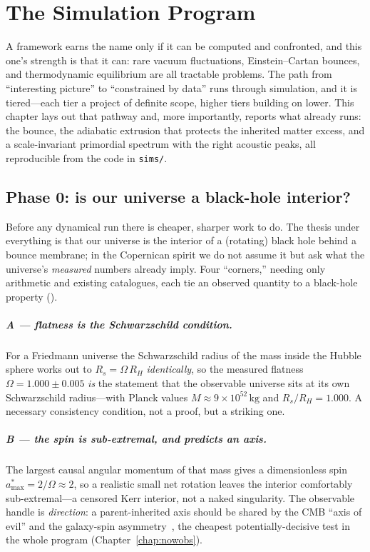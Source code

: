 \chapter{The Simulation Program}
\label{chap:sims}

A framework earns the name only if it can be computed and confronted, and this
one's strength is that it can: rare vacuum fluctuations, Einstein--Cartan bounces,
and thermodynamic equilibrium are all tractable problems. The path from
``interesting picture'' to ``constrained by data'' runs through simulation, and it
is tiered---each tier a project of definite scope, higher tiers building on lower.
This chapter lays out that pathway and, more importantly, reports what already
runs: the bounce, the adiabatic extrusion that protects the inherited matter
excess, and a scale-invariant primordial spectrum with the right acoustic peaks,
all reproducible from the code in \texttt{sims/}.

\section{Phase 0: is our universe a black-hole interior?}
\label{sec:phase0}

Before any dynamical run there is cheaper, sharper work to do. The thesis under
everything is that our universe is the interior of a (rotating) black hole behind
a bounce membrane; in the Copernican spirit we do not assume it but ask what the
universe's \emph{measured} numbers already imply. Four ``corners,'' needing only
arithmetic and existing catalogues, each tie an observed quantity to a black-hole
property ().

\paragraph{A --- flatness is the Schwarzschild condition.} For a Friedmann
universe the Schwarzschild radius of the mass inside the Hubble sphere works out
to $R_s = \Omega\,R_H$ \emph{identically}, so the measured flatness
$\Omega = 1.000\pm0.005$ \emph{is} the statement that the observable universe sits
at its own Schwarzschild radius---with Planck values
$M\approx9\times10^{52}\,\mathrm{kg}$ and $R_s/R_H=1.000$. A necessary
consistency condition, not a proof, but a striking one.

\paragraph{B --- the spin is sub-extremal, and predicts an axis.} The largest
causal angular momentum of that mass gives a dimensionless spin
$a^*_{\max}=2/\Omega\approx2$, so a realistic small net rotation leaves the
interior comfortably sub-extremal---a censored Kerr interior, not a naked
singularity. The observable handle is \emph{direction}: a parent-inherited axis
should be shared by the CMB ``axis of evil'' and the galaxy-spin
asymmetry~\citep{shamir2025}, the cheapest potentially-decisive test in the whole
program (Chapter~\ref{chap:nowobs}).

